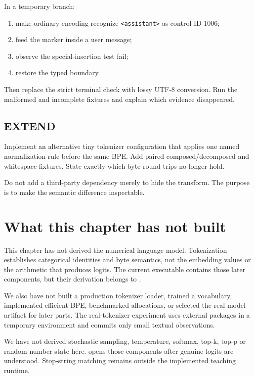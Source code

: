 In a temporary branch:

\begin{enumerate}
\def\labelenumi{\arabic{enumi}.}
\tightlist
\item
  make ordinary encoding recognize
  \texttt{\textless{}\textbar{}assistant\textbar{}\textgreater{}} as
  control ID 1006;
\item
  feed the marker inside a user message;
\item
  observe the special-insertion test fail;
\item
  restore the typed boundary.
\end{enumerate}

Then replace the strict terminal check with lossy UTF-8 conversion. Run
the malformed and incomplete fixtures and explain which evidence
disappeared.

\subsection{EXTEND}\label{extend-1}

Implement an alternative tiny tokenizer configuration that applies one
named normalization rule before the same BPE. Add paired
composed/decomposed and whitespace fixtures. State exactly which byte
round trips no longer hold.

Do not add a third-party dependency merely to hide the transform. The
purpose is to make the semantic difference inspectable.

\section{What this chapter has not
built}\label{what-this-chapter-has-not-built}

This chapter has not derived the numerical language model. Tokenization
establishes categorical identities and byte semantics, not the embedding
values or the arithmetic that produces logits. The current executable
contains those later components, but their derivation belongs to .

We also have not built a production tokenizer loader, trained a
vocabulary, implemented efficient BPE, benchmarked allocations, or
selected the real model artifact for later parts. The real-tokenizer
experiment uses external packages in a temporary environment and commits
only small textual observations.

We have not derived stochastic sampling, temperature, softmax, top-k, top-p
or random-number state here.  opens those components after genuine
logits are understood. Stop-string matching remains outside the implemented
teaching runtime.

